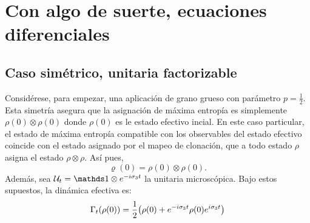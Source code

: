 \chapter{Con algo de suerte, ecuaciones diferenciales}
\section{Caso simétrico, unitaria factorizable}
Considérese, para empezar, una aplicación de grano grueso con parámetro $p=\frac{1}{2}$. Esta simetría asegura que la asignación de máxima entropía es simplemente $\rho(0)\otimes\rho(0)$ donde $\rho(0)$ es le estado efectivo incial. En este caso particular, el estado de máxima entropía compatible con los observables del estado efectivo coincide con el estado asignado por el mapeo de clonación, que a todo estado $\rho$ asigna el estado $\rho\otimes\rho$. Así pues,
\begin{equation*}
    \varrho(0)=\rho(0)\otimes\rho(0).
\end{equation*}
Además, sea $\mcU_{t}=\Id\otimes e^{-i\pauli{3}t}$ la unitaria microscópica. Bajo estos supuestos, la dinámica efectiva es:
\begin{equation*}
    \Gamma_{t}(\rho(0))=\frac{1}{2}\qty(\rho(0)+e^{-i\sigma_{3}t}\rho(0)e^{i\sigma_{3}t})
\end{equation*}